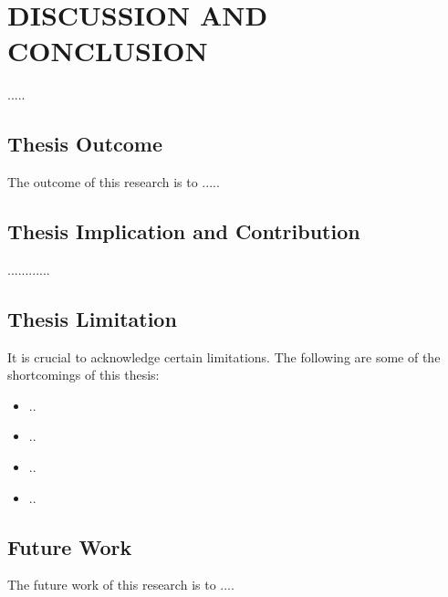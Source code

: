 \chapter{DISCUSSION AND CONCLUSION }\label{anotherchapter}
\vspace{-3em}
.....

\section{Thesis Outcome}
The outcome of this research is to .....

\section{Thesis Implication and Contribution}
 
 ............


\section{Thesis Limitation}

It is crucial to acknowledge certain limitations. The following are some of the shortcomings of this thesis:
\begin{itemize}
  \item ..
  \item ..
  \item ..
  \item ..
\end{itemize}

\section{Future Work}

The future work of this research is to ....


\endinput



 

